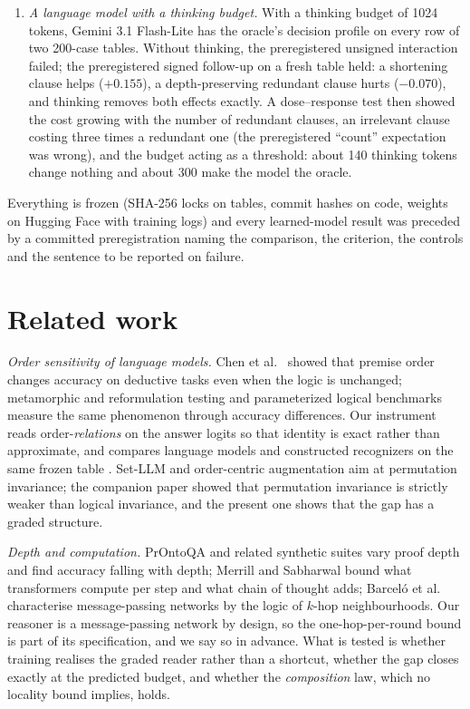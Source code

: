\begin{enumerate}
\item
  \emph{A language model with a thinking budget.} With a thinking budget of 1024 tokens, Gemini 3.1 Flash-Lite has the oracle's decision profile on every row of two 200-case tables. Without thinking, the preregistered unsigned interaction failed; the preregistered signed follow-up on a fresh table held: a shortening clause helps (\(+0.155\)), a depth-preserving redundant clause hurts (\(-0.070\)), and thinking removes both effects exactly. A dose--response test then showed the cost growing with the number of redundant clauses, an irrelevant clause costing three times a redundant one (the preregistered ``count'' expectation was wrong), and the budget acting as a threshold: about 140 thinking tokens change nothing and about 300 make the model the oracle.
\end{enumerate}

Everything is frozen (SHA-256 locks on tables, commit hashes on code, weights on Hugging Face with training logs) and every learned-model result was preceded by a committed preregistration naming the comparison, the criterion, the controls and the sentence to be reported on failure.

\section{Related work}\label{related-work}

\emph{Order sensitivity of language models.} Chen et al.~\cite{chen2024premise} showed that premise order changes accuracy on deductive tasks even when the logic is unchanged; metamorphic and reformulation testing \cite{zhou2026lgmt,gu2026crtbench} and parameterized logical benchmarks \cite{essebbani2026robustness} measure the same phenomenon through accuracy differences. Our instrument reads order-\emph{relations} on the answer logits so that identity is exact rather than approximate, and compares language models and constructed recognizers on the same frozen table \cite{ppi2026}. Set-LLM \cite{egressy2025setllm} and order-centric augmentation \cite{he2025order} aim at permutation invariance; the companion paper showed that permutation invariance is strictly weaker than logical invariance, and the present one shows that the gap has a graded structure.

\emph{Depth and computation.} PrOntoQA \cite{saparov2023prontoqa} and related synthetic suites vary proof depth and find accuracy falling with depth; Merrill and Sabharwal \cite{merrill2024cot} bound what transformers compute per step and what chain of thought adds; Barceló et al.~\cite{barcelo2020gnn} characterise message-passing networks by the logic of \(k\)-hop neighbourhoods. Our reasoner is a message-passing network by design, so the one-hop-per-round bound is part of its specification, and we say so in advance. What is tested is whether training realises the graded reader rather than a shortcut, whether the gap closes exactly at the predicted budget, and whether the \emph{composition} law, which no locality bound implies, holds.

